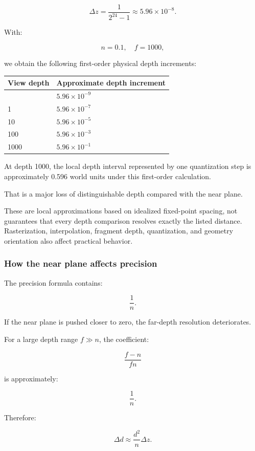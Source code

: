 \[
 \Delta z= \frac1{2^{24}-1} \approx5.96\times10^{-8}.
\]

With:

\[
 n=0.1,\quad f=1000,
\]

we obtain the following first-order physical depth increments:

{\def\LTcaptype{none} %
\begin{longtable}[]{@{}ll@{}}
\toprule\noalign{}
View depth & Approximate depth increment \\
\midrule\noalign{}
\endhead
\bottomrule\noalign{}
\endlastfoot
0.1 & \(5.96\times10^{-9}\) \\
1 & \(5.96\times10^{-7}\) \\
10 & \(5.96\times10^{-5}\) \\
100 & \(5.96\times10^{-3}\) \\
1000 & \(5.96\times10^{-1}\) \\
\end{longtable}
}

At depth 1000, the local depth interval represented by one quantization step is approximately 0.596 world units under this first-order calculation.

That is a major loss of distinguishable depth compared with the near plane.

These are local approximations based on idealized fixed-point spacing, not guarantees that every depth comparison resolves exactly the listed distance. Rasterization, interpolation, fragment depth, quantization, and geometry orientation also affect practical behavior.

\subsubsection{How the near plane affects precision}\label{how-the-near-plane-affects-precision}

The precision formula contains:

\[
 \frac1n.
\]

If the near plane is pushed closer to zero, the far-depth resolution deteriorates.

For a large depth range \(f\gg n\), the coefficient:

\[
 \frac{f-n}{fn}
\]

is approximately:

\[
 \frac1n.
\]

Therefore:

\[
 \boxed{ \Delta d\approx\frac{d^2}{n}\Delta z }.
\]

